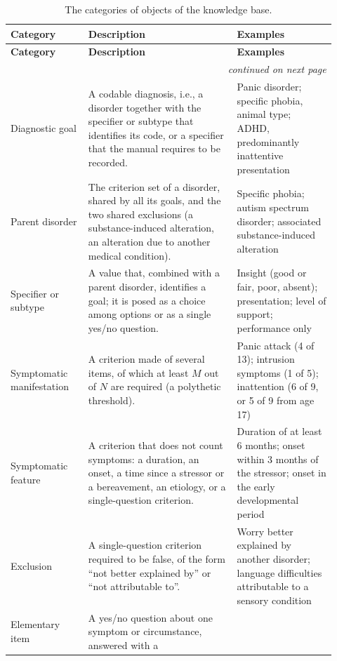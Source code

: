 \begin{longtable}{@{}p{0.22\linewidth} p{0.42\linewidth} p{0.28\linewidth}@{}}
\caption{The categories of objects of the knowledge base.}\label{tab:objects}\\
\toprule
\textbf{Category} & \textbf{Description} & \textbf{Examples} \\
\midrule
\endfirsthead
\toprule
\textbf{Category} & \textbf{Description} & \textbf{Examples} \\
\midrule
\endhead
\midrule
\multicolumn{3}{r}{\footnotesize\itshape continued on next page}\\
\endfoot
\bottomrule
\endlastfoot
Diagnostic goal &
A codable diagnosis, i.e., a disorder together with the specifier or subtype
that identifies its code, or a specifier that the manual requires to be recorded. &
Panic disorder; specific phobia, animal type; ADHD, predominantly inattentive
presentation \\
\addlinespace
Parent disorder &
The criterion set of a disorder, shared by all its goals, and the two shared
exclusions (a substance-induced alteration, an alteration due to another
medical condition). &
Specific phobia; autism spectrum disorder; associated substance-induced
alteration \\
\addlinespace
Specifier or subtype &
A value that, combined with a parent disorder, identifies a goal; it is posed as
a choice among options or as a single yes/no question. &
Insight (good or fair, poor, absent); presentation; level of support;
performance only \\
\addlinespace
Symptomatic manifestation &
A criterion made of several items, of which at least $M$ out of $N$ are
required (a polythetic threshold). &
Panic attack (4 of 13); intrusion symptoms (1 of 5); inattention (6 of 9, or 5
of 9 from age 17) \\
\addlinespace
Symptomatic feature &
A criterion that does not count symptoms: a duration, an onset, a time since a
stressor or a bereavement, an etiology, or a single-question criterion. &
Duration of at least 6 months; onset within 3 months of the stressor; onset in
the early developmental period \\
\addlinespace
Exclusion &
A single-question criterion required to be false, of the form ``not better
explained by'' or ``not attributable to''. &
Worry better explained by another disorder; language difficulties attributable
to a sensory condition \\
\addlinespace
Elementary item &
A yes/no question about one symptom or circumstance, answered with a

\end{longtable}

